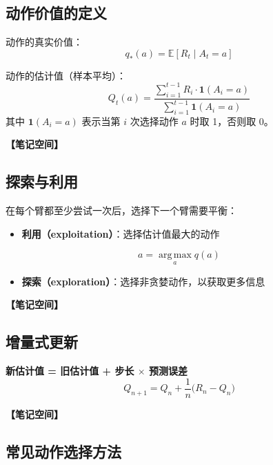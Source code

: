 \documentclass[12pt,a4paper]{article}
\newcommand{\notespace}[1][3cm]{%
  \vspace{#1}%
  \noindent\textbf{【笔记空间】}%
  \vspace{#1}%
}
\newcommand{\E}{\mathbb{E}}
\newcommand{\1}{\mathbf{1}}
\newcommand{\argmax}{\operatorname*{arg\,max}}
\begin{document}
\subsection{动作价值的定义}

动作的真实价值：
\begin{equation}
q_*(a)=\E[R_t \mid A_t=a]
\end{equation}

动作的估计值（样本平均）：
\begin{equation}
Q_t(a)=\frac{\sum_{i=1}^{t-1} R_i \cdot \1(A_i=a)}{\sum_{i=1}^{t-1} \1(A_i=a)}
\end{equation}
其中 $\1(A_i=a)$ 表示当第 $i$ 次选择动作 $a$ 时取 1，否则取 0。

\notespace[2cm]

\subsection{探索与利用}

在每个臂都至少尝试一次后，选择下一个臂需要平衡：

\begin{itemize}[leftmargin=2em]
  \item \textbf{利用（exploitation）}：选择估计值最大的动作
\end{itemize}

\begin{equation}
a=\argmax_a q(a)
\end{equation}

\begin{itemize}[leftmargin=2em]
  \item \textbf{探索（exploration）}：选择非贪婪动作，以获取更多信息
\end{itemize}

\notespace[2cm]

\subsection{增量式更新}

\begin{keybox}
\textbf{新估计值 = 旧估计值 + 步长 $\times$ 预测误差}
\begin{equation}
Q_{n+1} = Q_n + \frac{1}{n}\bigl(R_n - Q_n\bigr)
\end{equation}
\end{keybox}

\notespace[2cm]

\subsection{常见动作选择方法}
\end{document}
